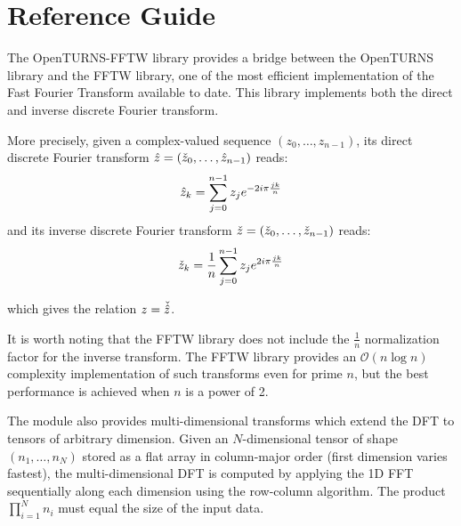 % 




\section{Reference Guide}

The OpenTURNS-FFTW library provides a bridge between the OpenTURNS library and the FFTW library, one of the most efficient implementation of the Fast Fourier Transform available to date. This library implements both the direct and inverse discrete Fourier transform.

More precisely, given a complex-valued sequence $(z_0,\dots,z_{n-1})$, its direct discrete Fourier transform $\Hat{z}=(\Check{z}_0,\dots,\Hat{z}_{n-1})$ reads:
$$
\Hat{z}_k = \sum_{j=0}^{n-1}z_j e^{-2i\pi\frac{jk}{n}}
$$
and its inverse discrete Fourier transform $\Check{z}=(\Check{z}_0,\dots,\Check{z}_{n-1})$ reads:
$$
\Check{z}_k = \frac{1}{n}\sum_{j=0}^{n-1}z_j e^{2i\pi\frac{jk}{n}}
$$

which gives the relation $z=\Check{\Hat{z}}$.

It is worth noting that the FFTW library does not include the $\frac{1}{n}$ normalization factor for the inverse transform. The FFTW library provides an $\mathcal{O}(n\log n)$ complexity implementation of such transforms even for prime $n$, but the best performance is achieved when $n$ is a power of 2.

The module also provides multi-dimensional transforms which extend the DFT to tensors of arbitrary dimension. Given an $N$-dimensional tensor of shape $(n_1,\dots,n_N)$ stored as a flat array in column-major order (first dimension varies fastest), the multi-dimensional DFT is computed by applying the 1D FFT sequentially along each dimension using the row-column algorithm. The product $\prod_{i=1}^N n_i$ must equal the size of the input data.